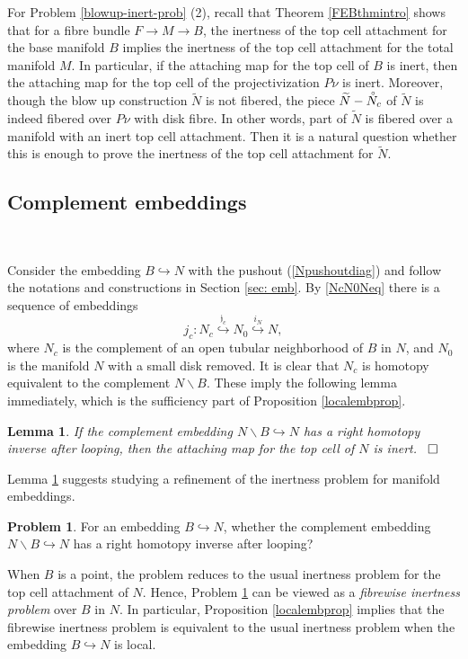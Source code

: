 \documentclass[a4]{amsart}
\newtheorem{lemma}[theorem]{Lemma}
\theoremstyle{definition}
\newtheorem{problem}[theorem]{Problem}
\newcommand{\qqed}{\hfill\Box}
\begin{document}
\begin{sloppypar}
For Problem \ref{blowup-inert-prob} (2), recall that Theorem \ref{FEBthmintro} shows that for a fibre bundle $F\stackrel{}{\longrightarrow} M\stackrel{}{\longrightarrow} B$, the inertness of the top cell attachment for the base manifold $B$ implies the inertness of the top cell attachment for the total manifold $M$. In particular, if the attaching map for the top cell of $B$ is inert, then the attaching map for the top cell of the projectivization $P\nu$ is inert. Moreover, though the blow up construction $\widetilde{N}$ is not fibered, the piece $\widetilde{N}-\accentset{\circ}{N}_c$ of $\widetilde{N}$ is indeed fibered over $P\nu$ with disk fibre. In other words, part of $\widetilde{N}$ is fibered over a manifold with an inert top cell attachment. Then it is a natural question whether this is enough to prove the inertness of the top cell attachment for $\widetilde{N}$. 

\subsection{Complement embeddings}
\label{subsec: com-emb-prob}

$\, $

Consider the embedding $B\stackrel{}{\hookrightarrow}N$ with the pushout (\ref{Npushoutdiag}) and follow the notations and constructions in Section \ref{sec: emb}. By \eqref{NcN0Neq} there is a sequence of embeddings
\[
j_c: N_c\stackrel{\mathfrak{j}_c}{\hookrightarrow} N_0\stackrel{i_N}{\hookrightarrow} N,
\]
where $N_c$ is the complement of an open tubular neighborhood of $B$ in $N$, and $N_0$ is the manifold $N$ with a small disk removed. It is clear that $N_c$ is homotopy equivalent to the complement $N\backslash B$. 
These imply the following lemma immediately, which is the sufficiency part of Proposition \ref{localembprop}. 

\begin{lemma}\label{Nclemma}
If the complement embedding $N\backslash B\stackrel{}{\hookrightarrow} N$ has a right homotopy inverse after looping, then the attaching map for the top cell of $N$ is inert.  ~$\qqed$
\end{lemma}

Lemma \ref{Nclemma} suggests studying a refinement of the inertness problem for manifold embeddings. 

\begin{problem}\label{strongint-prob}
For an embedding $B\stackrel{}{\hookrightarrow}N$, whether the complement embedding $N\backslash B\stackrel{}{\hookrightarrow} N$ has a right homotopy inverse after looping?
\end{problem}
When $B$ is a point, the problem reduces to the usual inertness problem for the top cell attachment of $N$. Hence, Problem \ref{strongint-prob} can be viewed as a {\it fibrewise inertness problem} over $B$ in $N$. 
In particular, Proposition \ref{localembprop} implies that the fibrewise inertness problem is equivalent to the usual inertness problem when the embedding $B\stackrel{}{\hookrightarrow}N$ is local. 


\end{sloppypar}
\end{document}
